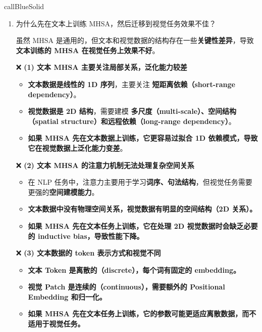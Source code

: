 \documentclass[zihao=false,fontset=windows]{ctexart}
\newcommand{\feiEmoji}[1]{{\emojifont #1}}
\newcommand{\yel}[1]{\colorbox{hiYellow}{#1}}
\begin{document}
\begin{feishubox}{callBlueSolid}{🙋}
\begin{enumerate}
\feiEmoji{✅} \textbf{(3) 视觉训练的 MHSA 具有更好的归纳偏置（Inductive Bias）}\par
\begin{itemize}
\item 视觉任务的 MHSA 需要学习到\textbf{局部感受野（locality）、层级结构（hierarchical structure）、长程依赖（long-range dependencies）}，而这些结构在文本数据中同样存在。
\item 由于视觉中的注意力结构比文本更加丰富，MHSA 在视觉上训练时，会更全面地学习如何建模不同类型的关系。
\item 所以，\textbf{视觉训练的 MHSA 在文本任务上依然适用，而反过来却不行}。
\end{itemize}
\item \yel{为什么先在文本上训练 MHSA，然后迁移到视觉任务效果不佳？}\par
虽然 MHSA 是通用的，但文本和视觉数据的结构存在一些\textbf{关键性差异}，导致 \textbf{文本训练的 MHSA 在视觉任务上效果不好}。\par
\feiEmoji{❌} \textbf{(1) 文本 MHSA 主要关注局部关系，泛化能力较差}\par
\begin{itemize}
\item \textbf{文本数据是线性的 1D 序列}，主要关注 \textbf{短距离依赖（short-range dependency）}。
\item \textbf{视觉数据是 2D 结构}，需要建模 \textbf{多尺度（multi-scale）、空间结构（spatial structure）和远程依赖（long-range dependency）}。
\item \textbf{如果 MHSA 先在文本数据上训练，它更容易过拟合 1D 依赖模式，导致它在视觉数据上泛化能力变差}。
\end{itemize}
\feiEmoji{❌} \textbf{(2) 文本 MHSA 的注意力机制无法处理复杂空间关系}\par
\begin{itemize}
\item 在 NLP 任务中，注意力主要用于学习\textbf{词序、句法结构}，但视觉任务需要更强的\textbf{空间建模能力}。
\item \textbf{文本数据中没有物理空间关系，视觉数据有明显的空间结构（2D 关系）。}
\item \textbf{如果 MHSA 先在文本任务上训练，它在处理 2D 视觉数据时会缺乏必要的 inductive bias，导致性能下降。}
\end{itemize}
\feiEmoji{❌} \textbf{(3) 文本数据的 token 表示方式和视觉不同}\par
\begin{itemize}
\item \textbf{文本 Token 是离散的（discrete），每个词有固定的 embedding。}
\item \textbf{视觉 Patch 是连续的（continuous），需要额外的 Positional Embedding 和归一化。}
\item \textbf{如果 MHSA 先在文本任务上训练，它的参数可能更适应离散数据，而不适用于视觉任务。}
\end{itemize}
\end{enumerate}
\end{feishubox}
\end{document}

